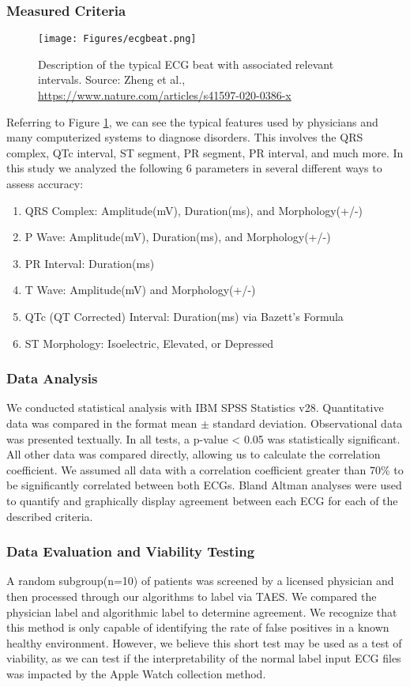 \documentclass[
	a4paper, 
	10pt, 
	twoside, 
]{LTJournalArticle}
\begin{document}
\subsubsection{Measured Criteria}
\begin{figure} [!h]
	\texttt{[image: Figures/ecgbeat.png]}
	\caption{Description of the typical ECG beat with associated relevant intervals. Source: Zheng et al., \href{https://www.nature.com/articles/s41597-020-0386-x}{https://www.nature.com/articles/s41597-020-0386-x}}
	\label{fig:zheng}
\end{figure}
Referring to Figure \ref{fig:zheng}, we can see the typical features used by physicians and many computerized systems to diagnose disorders. This involves the QRS complex, QTc interval, ST segment, PR segment, PR interval, and much more. 
In this study we analyzed the following 6 parameters in several different ways to assess accuracy:
\begin{enumerate}
    \item QRS Complex: Amplitude(mV), Duration(ms), and Morphology(+/-)
    \item P Wave: Amplitude(mV), Duration(ms), and Morphology(+/-)
    \item PR Interval: Duration(ms)
    \item T Wave: Amplitude(mV) and Morphology(+/-)
    \item QTc (QT Corrected) Interval: Duration(ms) via Bazett's Formula
    \item ST Morphology: Isoelectric, Elevated, or Depressed 
\end{enumerate}
\subsubsection{Data Analysis}
We conducted statistical analysis with IBM SPSS Statistics v28. Quantitative data was compared in the format mean $\pm$ standard deviation. Observational data was presented textually. In all tests, a p-value < 0.05 was statistically significant. All other data was compared directly, allowing us to calculate the correlation coefficient. We assumed all data with a correlation coefficient greater than 70\% to be significantly correlated between both ECGs.  Bland Altman analyses were used to quantify and graphically display agreement between each ECG for each of the described criteria.   

\subsubsection{Data Evaluation and Viability Testing}
A random subgroup(n=10) of patients was screened by a licensed physician and then processed through our algorithms to label via TAES. We compared the physician label and algorithmic label to determine agreement. We recognize that this method is only capable of identifying the rate of false positives in a known healthy environment. However, we believe this short test may be used as a test of viability, as we can test if the interpretability of the normal label input ECG files was impacted by the Apple Watch collection method. 
\end{document}

